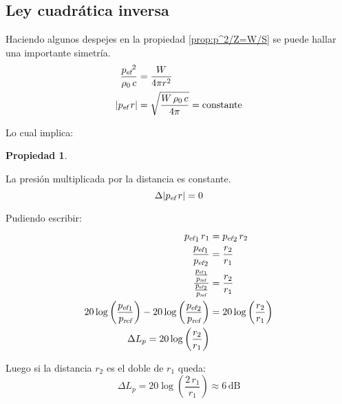 \documentclass[a5paper,12pt,twoside]{book}
\newtheorem{prop}{{Propiedad}}[chapter]
\begin{document}
\subsection{Ley cuadrática inversa}
\label{sec:inverseSquareLaw}

Haciendo algunos despejes en la propiedad \ref{prop:p^2/Z=W/S} se puede hallar una importante simetría.
\begin{align*}
    \frac{{{{p}_\textsl{{ef}}}}^2}{\rho_0 \, c} &= \frac{W}{4\pi r^2}
    \\
    {\left| {{{{p}_\textsl{{ef}}}} \, r} \right|} &= \sqrt{\frac{W \, \rho_0 \, c}{4\pi}} = \textrm{constante}
\end{align*}

Lo cual implica:

\begin{mdframed}[style=PropertyFrame]
    \begin{prop}
    \end{prop}
    La presión multiplicada por la distancia es constante.
    \begin{equation*}
        \Delta {\left| {{{{p}_\textsl{{ef}}}} \, r} \right|} = 0
    \end{equation*}
\end{mdframed}

Pudiendo escribir:
\begin{align*}
    {{{{p}_\textsl{{ef}}}}}_1 \, r_1 &= {{{{p}_\textsl{{ef}}}}}_2 \, r_2
    \\
    \frac{{{{{p}_\textsl{{ef}}}}}_1}{{{{{p}_\textsl{{ef}}}}}_2} &= \frac{r_2}{r_1}
    \\
    \frac{\tfrac{{{{{p}_\textsl{{ef}}}}}_1}{{{p}_\textsl{{ref}}}}}{\tfrac{{{{{p}_\textsl{{ef}}}}}_2}{{{p}_\textsl{{ref}}}}} &= \frac{r_2}{r_1}
    \\
    20 \log \left( \frac{{{{{p}_\textsl{{ef}}}}}_1}{{{p}_\textsl{{ref}}}} \right) - 20 \log \left( \frac{{{{{p}_\textsl{{ef}}}}}_2}{{{p}_\textsl{{ref}}}} \right) &= 20 \log \left( \frac{r_2}{r_1} \right)
    \\
    \Delta L_p = 20 \log \left( \frac{r_2}{r_1} \right)
\end{align*}

Luego si la distancia $r_2$ es el doble de $r_1$ queda:
\begin{equation*}
    \Delta L_p = 20 \log \left( \frac{2 \, r_1}{r_1} \right) \approx 6\,\si{\deci\bel}
\end{equation*}


\end{document}
